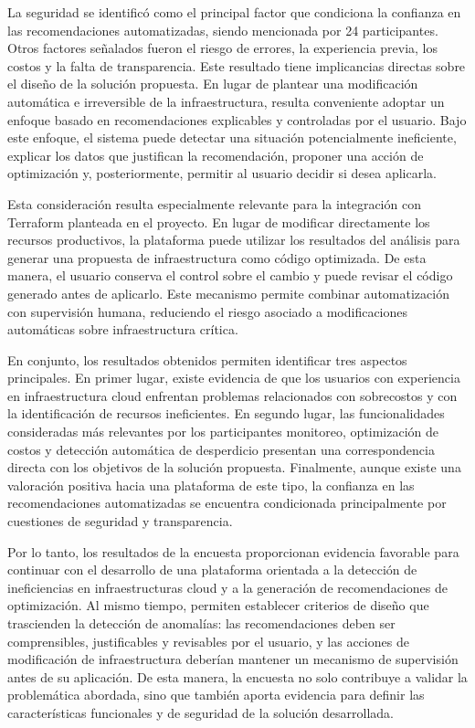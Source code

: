 La seguridad se identificó como el principal factor que condiciona la
confianza en las recomendaciones automatizadas, siendo mencionada por 24
participantes. Otros factores señalados fueron el riesgo de errores, la
experiencia previa, los costos y la falta de transparencia. Este
resultado tiene implicancias directas sobre el diseño de la solución
propuesta. En lugar de plantear una modificación automática e
irreversible de la infraestructura, resulta conveniente adoptar un
enfoque basado en recomendaciones explicables y controladas por el
usuario. Bajo este enfoque, el sistema puede detectar una situación
potencialmente ineficiente, explicar los datos que justifican la
recomendación, proponer una acción de optimización y, posteriormente,
permitir al usuario decidir si desea aplicarla.

Esta consideración resulta especialmente relevante para la integración
con Terraform planteada en el proyecto. En lugar de modificar
directamente los recursos productivos, la plataforma puede utilizar los
resultados del análisis para generar una propuesta de infraestructura
como código optimizada. De esta manera, el usuario conserva el control
sobre el cambio y puede revisar el código generado antes de aplicarlo.
Este mecanismo permite combinar automatización con supervisión humana,
reduciendo el riesgo asociado a modificaciones automáticas sobre
infraestructura crítica.

En conjunto, los resultados obtenidos permiten identificar tres aspectos
principales. En primer lugar, existe evidencia de que los usuarios con
experiencia en infraestructura cloud enfrentan problemas relacionados
con sobrecostos y con la identificación de recursos ineficientes. En
segundo lugar, las funcionalidades consideradas más relevantes por los
participantes monitoreo, optimización de costos y detección automática
de desperdicio presentan una correspondencia directa con los objetivos
de la solución propuesta. Finalmente, aunque existe una valoración
positiva hacia una plataforma de este tipo, la confianza en las
recomendaciones automatizadas se encuentra condicionada principalmente
por cuestiones de seguridad y transparencia.

Por lo tanto, los resultados de la encuesta proporcionan evidencia
favorable para continuar con el desarrollo de una plataforma orientada a
la detección de ineficiencias en infraestructuras cloud y a la
generación de recomendaciones de optimización. Al mismo tiempo, permiten
establecer criterios de diseño que trascienden la detección de
anomalías: las recomendaciones deben ser comprensibles, justificables y
revisables por el usuario, y las acciones de modificación de
infraestructura deberían mantener un mecanismo de supervisión antes de
su aplicación. De esta manera, la encuesta no solo contribuye a validar
la problemática abordada, sino que también aporta evidencia para definir
las características funcionales y de seguridad de la solución
desarrollada.

